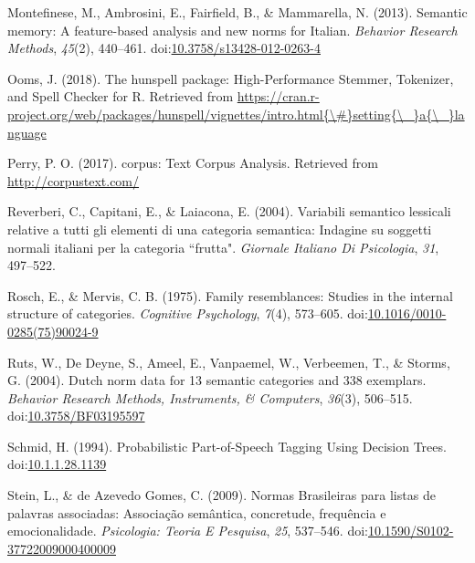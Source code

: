 \documentclass[man]{apa6}
\begin{document}
\leavevmode\hypertarget{ref-Montefinese2013}{}%
Montefinese, M., Ambrosini, E., Fairfield, B., \& Mammarella, N. (2013). Semantic memory: A feature-based analysis and new norms for Italian. \emph{Behavior Research Methods}, \emph{45}(2), 440--461. doi:\href{https://doi.org/10.3758/s13428-012-0263-4}{10.3758/s13428-012-0263-4}

\leavevmode\hypertarget{ref-Ooms2018}{}%
Ooms, J. (2018). The hunspell package: High-Performance Stemmer, Tokenizer, and Spell Checker for R. Retrieved from \href{https://cran.r-project.org/web/packages/hunspell/vignettes/intro.html\%7B/\#\%7Dsetting\%7B/_\%7Da\%7B/_\%7Dlanguage}{https://cran.r-project.org/web/packages/hunspell/vignettes/intro.html\{\textbackslash{}\#\}setting\{\textbackslash{}\_\}a\{\textbackslash{}\_\}language}

\leavevmode\hypertarget{ref-Perry2017}{}%
Perry, P. O. (2017). corpus: Text Corpus Analysis. Retrieved from \url{http://corpustext.com/}

\leavevmode\hypertarget{ref-Reverberi2004}{}%
Reverberi, C., Capitani, E., \& Laiacona, E. (2004). Variabili semantico lessicali relative a tutti gli elementi di una categoria semantica: Indagine su soggetti normali italiani per la categoria ``frutta". \emph{Giornale Italiano Di Psicologia}, \emph{31}, 497--522.

\leavevmode\hypertarget{ref-Rosch1975}{}%
Rosch, E., \& Mervis, C. B. (1975). Family resemblances: Studies in the internal structure of categories. \emph{Cognitive Psychology}, \emph{7}(4), 573--605. doi:\href{https://doi.org/10.1016/0010-0285(75)90024-9}{10.1016/0010-0285(75)90024-9}

\leavevmode\hypertarget{ref-Ruts2004}{}%
Ruts, W., De Deyne, S., Ameel, E., Vanpaemel, W., Verbeemen, T., \& Storms, G. (2004). Dutch norm data for 13 semantic categories and 338 exemplars. \emph{Behavior Research Methods, Instruments, \& Computers}, \emph{36}(3), 506--515. doi:\href{https://doi.org/10.3758/BF03195597}{10.3758/BF03195597}

\leavevmode\hypertarget{ref-Schmid1994}{}%
Schmid, H. (1994). Probabilistic Part-of-Speech Tagging Using Decision Trees. doi:\href{https://doi.org/10.1.1.28.1139}{10.1.1.28.1139}

\leavevmode\hypertarget{ref-Stein2009}{}%
Stein, L., \& de Azevedo Gomes, C. (2009). Normas Brasileiras para listas de palavras associadas: Associação semântica, concretude, frequência e emocionalidade. \emph{Psicologia: Teoria E Pesquisa}, \emph{25}, 537--546. doi:\href{https://doi.org/10.1590/S0102-37722009000400009}{10.1590/S0102-37722009000400009}
\end{document}
